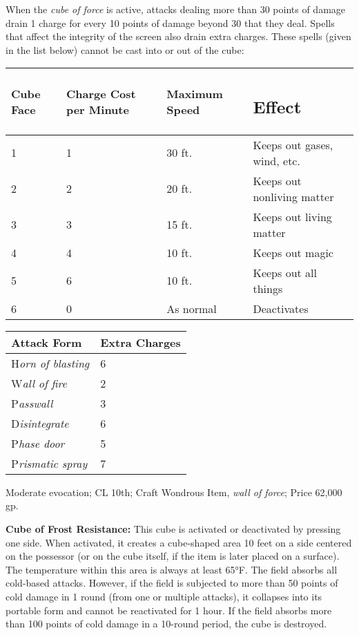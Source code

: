 \documentclass{article}
\begin{document}
When the \textit{cube of force }is active, attacks dealing more than 30 points 
of damage drain 1 charge for every 10 points of damage beyond 30 that they deal. 
Spells that affect the integrity of the screen\textit{ }also drain extra charges. 
These spells (given in the list below) cannot be cast into or out of the cube:

\begin{tabular}{|>{\raggedright}p{21pt}|>{\raggedright}p{58pt}|>{\raggedright}p{51pt}|>{\raggedright}p{112pt}|}
\hline
C\textbf{ube Face} & C\textbf{harge Cost per Minute} & M\textbf{aximum Speed} & \subsection*{E\textbf{ffect}}\tabularnewline
\hline
1 & 1 & 30 ft. & Keeps out gases, wind, etc.\tabularnewline
\hline
2 & 2 & 20 ft. & Keeps out nonliving matter\tabularnewline
\hline
3 & 3 & 15 ft. & Keeps out living matter\tabularnewline
\hline
4 & 4 & 10 ft. & Keeps out magic\tabularnewline
\hline
5 & 6 & 10 ft. & Keeps out all things\tabularnewline
\hline
6 & 0 & As normal & Deactivates\tabularnewline
\hline
\end{tabular}

\vspace{12pt}
\begin{tabular}{|>{\raggedright}p{69pt}|>{\raggedright}p{66pt}|}
\hline
A\textbf{ttack Form} & E\textbf{xtra Charges}\tabularnewline
\hline
H\textit{orn of blasting} & 6\tabularnewline
\hline
W\textit{all of fire} & 2\tabularnewline
\hline
P\textit{asswall} & 3\tabularnewline
\hline
D\textit{isintegrate} & 6\tabularnewline
\hline
P\textit{hase door} & 5\tabularnewline
\hline
P\textit{rismatic spray} & 7\tabularnewline
\hline
\end{tabular}

Moderate evocation; CL 10th; Craft Wondrous Item, \textit{wall of force}; Price 
62,000 gp.

\textbf{Cube of Frost Resistance:} This cube is activated or deactivated by pressing 
one side. When activated, it creates a cube-shaped area 10 feet on a side centered 
on the possessor (or on the cube itself, if the item is later placed on a surface)\textit{. 
}The temperature within this area is always at least 65°F. The field absorbs all 
cold-based attacks. However, if the field is subjected to more than 50 points of 
cold damage in 1 round (from one or multiple attacks), it collapses into its portable 
form and cannot be reactivated for 1 hour. If the field absorbs more than 100 points 
of cold damage in a 10-round period, the cube is destroyed.
\end{document}
